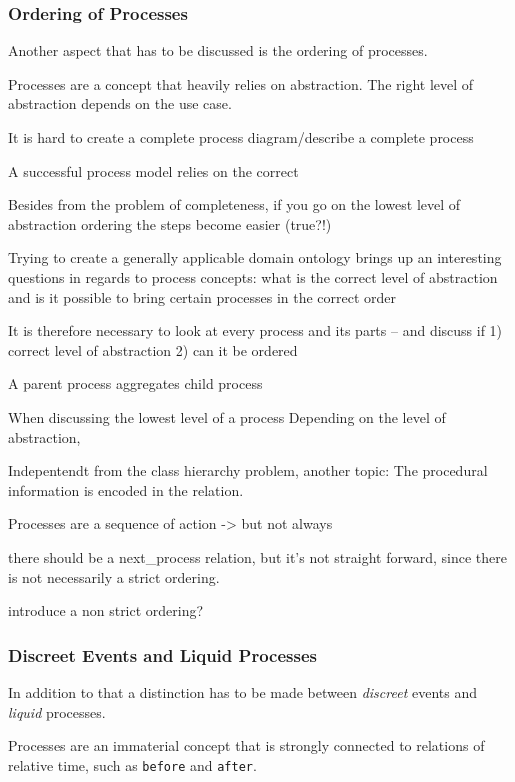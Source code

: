 \documentclass[a4paper, DIV=13, BCOR=0cm]{scrbook}
\newcommand{\relation}[1]{\texttt{#1}}
\begin{document}
\subsubsection{Ordering of Processes }
Another aspect that has to be discussed is the ordering of processes.

Processes are a concept that heavily relies on abstraction. The right level of abstraction depends on the use case.

\begin{compactenum}
	\item It is hard to create a complete process diagram/describe a complete process
	\item A successful process model relies on the correct 
	\item Besides from the problem of completeness, if you go on the lowest level of abstraction ordering the steps become easier (true?!)
	\item Trying to create a generally applicable domain ontology brings up an interesting questions in regards to process concepts: what is the correct level of abstraction and is it possible to bring certain processes in the correct order
	\item It is therefore necessary to look at every process and its parts -- and discuss if 1) correct level of abstraction 2) can it be ordered
	\item A parent process aggregates child process 

	\item When discussing the lowest level of a process Depending on the level of abstraction, 
	\item Indepentendt from the class hierarchy problem, another topic: The procedural information is encoded in the relation.
	\item Processes are a sequence of action -> but not always
	\item there should be a next\_process relation, but it's not straight forward, since there is not necessarily a strict ordering.
	\item introduce a non strict ordering?
\end{compactenum}

\subsubsection{Discreet Events and Liquid Processes}

\begin{compactenum}
\item In addition to that a distinction has to be made between \textit{discreet} events and \textit{liquid} processes. \cite[p.\,447]{Russell:2010aa}
\item Processes are an immaterial concept that is strongly connected to relations of relative time, such as \relation{before} and \relation{after}. 
\end{compactenum}
\end{document}
